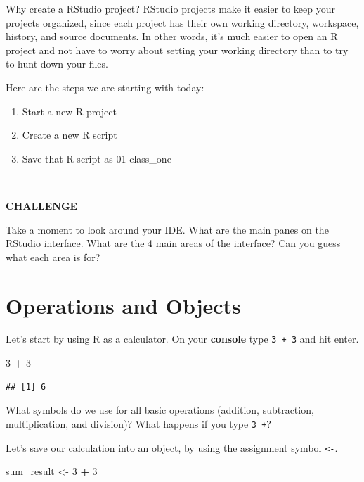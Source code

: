\documentclass[
]{book}
\newenvironment{Shaded}{\begin{snugshade}}{\end{snugshade}}
\newcommand{\DecValTok}[1]{\textcolor[rgb]{0.00,0.00,0.81}{#1}}
\newcommand{\NormalTok}[1]{#1}
\newcommand{\OperatorTok}[1]{\textcolor[rgb]{0.81,0.36,0.00}{\textbf{#1}}}
\newcommand{\StringTok}[1]{\textcolor[rgb]{0.31,0.60,0.02}{#1}}
\begin{document}
Why create a RStudio project? RStudio projects make it easier to keep your projects organized, since each project has their own working directory, workspace, history, and source documents. In other words, it's much easier to open an R project and not have to worry about setting your working directory than to try to hunt down your files.

Here are the steps we are starting with today:

\begin{enumerate}
\def\labelenumi{\arabic{enumi}.}
\item
  Start a new R project
\item
  Create a new R script
\item
  Save that R script as 01-class\_one
\end{enumerate}

~

\textbf{CHALLENGE}

Take a moment to look around your IDE. What are the main panes on the RStudio interface. What are the 4 main areas of the interface? Can you guess what each area is for?

\hypertarget{operations-and-objects}{%
\section{Operations and Objects}\label{operations-and-objects}}

Let's start by using R as a calculator. On your \textbf{console} type \texttt{3\ +\ 3} and hit enter.

\begin{Shaded}
\begin{Highlighting}[]
\DecValTok{3} \OperatorTok{+}\StringTok{ }\DecValTok{3}
\end{Highlighting}
\end{Shaded}

\begin{verbatim}
## [1] 6
\end{verbatim}

What symbols do we use for all basic operations (addition, subtraction, multiplication, and division)?
What happens if you type \texttt{3\ +}?

Let's save our calculation into an object, by using the assignment symbol \texttt{\textless{}-}.

\begin{Shaded}
\begin{Highlighting}[]
\NormalTok{sum_result <-}\StringTok{ }\DecValTok{3} \OperatorTok{+}\StringTok{ }\DecValTok{3}
\end{Highlighting}
\end{Shaded}
\end{document}
